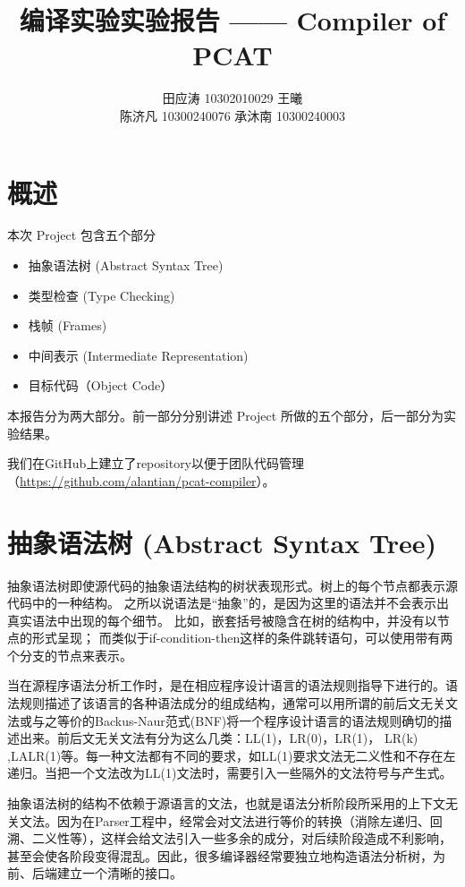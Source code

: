﻿\documentclass{article}
\title {编译实验实验报告 —— Compiler of PCAT}
\author {田应涛 10302010029 \quad 王曦 \quad 10300240014\\ 陈济凡 10300240076 \quad 承沐南 10300240003}
\begin{document}
\maketitle
\tableofcontents

\newpage

\section{概述}  

本次 Project 包含五个部分
\begin{itemize}
\item 抽象语法树 (Abstract Syntax Tree)
\item 类型检查 (Type Checking)
\item 栈帧 (Frames)
\item 中间表示 (Intermediate Representation)
\item 目标代码（Object Code）
\end{itemize}

本报告分为两大部分。前一部分分别讲述 Project 所做的五个部分，后一部分为实验结果。

我们在GitHub上建立了repository以便于团队代码管理（\url{https://github.com/alantian/pcat-compiler}）。

\section{抽象语法树 (Abstract Syntax Tree)}

抽象语法树即使源代码的抽象语法结构的树状表现形式。树上的每个节点都表示源代码中的一种结构。
之所以说语法是“抽象”的，是因为这里的语法并不会表示出真实语法中出现的每个细节。
比如，嵌套括号被隐含在树的结构中，并没有以节点的形式呈现；
而类似于if-condition-then这样的条件跳转语句，可以使用带有两个分支的节点来表示。

当在源程序语法分析工作时，是在相应程序设计语言的语法规则指导下进行的。语法规则描述了该语言的各种语法成分的组成结构，通常可以用所谓的前后文无关文法或与之等价的Backus-Naur范式(BNF)将一个程序设计语言的语法规则确切的描述出来。前后文无关文法有分为这么几类：LL(1)，LR(0)，LR(1)， LR(k) ,LALR(1)等。每一种文法都有不同的要求，如LL(1)要求文法无二义性和不存在左递归。当把一个文法改为LL(1)文法时，需要引入一些隔外的文法符号与产生式。

抽象语法树的结构不依赖于源语言的文法，也就是语法分析阶段所采用的上下文无关文法。因为在Parser工程中，经常会对文法进行等价的转换（消除左递归、回溯、二义性等），这样会给文法引入一些多余的成分，对后续阶段造成不利影响，甚至会使各阶段变得混乱。因此，很多编译器经常要独立地构造语法分析树，为前、后端建立一个清晰的接口。
\end{document}
